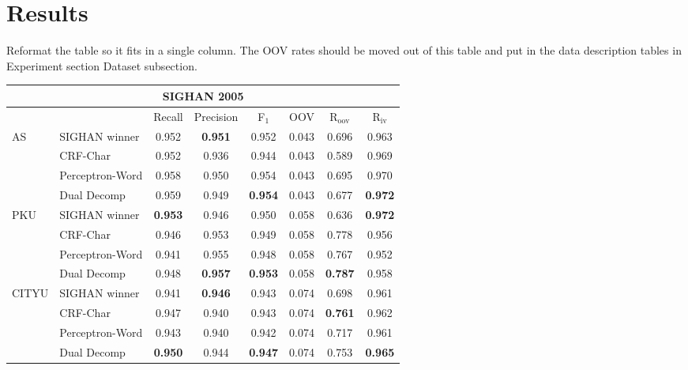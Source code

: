 \section{Results}

Reformat the table so it fits in a single column. 
The OOV rates should be moved out of this table and put in the data description tables in Experiment section Dataset subsection.

\begin{table*}
\centering
\begin{small}
\begin{tabular}{ l | l | c | c | c | c | c | c   }
\multicolumn{8}{c}{\large{SIGHAN 2005}} \\
\hline
    \multicolumn{2}{c}{}  &  \multicolumn{1}{c}{Recall} &  \multicolumn{1}{c}{Precision}  & \multicolumn{1}{c}{F$_1$}   &  \multicolumn{1}{c}{OOV} &   \multicolumn{1}{c|}{R$_{\mathrm{oov}}$}    &  \multicolumn{1}{c}{R$_{\mathrm{iv}}$}   \\ 
\hline
\multirow{4}{*}{AS} & SIGHAN winner      & 0.952 &  \textbf{0.951} & 0.952 &  0.043  &  0.696 &  0.963 \\
& CRF-Char                                                        & 0.952 &   0.936 & 0.944 & 0.043 &  0.589 & 0.969 \\
 & Perceptron-Word                                       & 0.958 & 0.950 & 0.954 & 0.043 & 0.695 & 0.970 \\ 
& Dual Decomp                                       & 0.959 & 0.949 & \textbf{0.954} & 0.043 & {0.677} & \textbf{0.972} \\
\hline

\multirow{4}{*}{PKU} &  SIGHAN winner       & \textbf{0.953}  &      0.946 &  0.950 & 0.058  &  0.636 &  \textbf{0.972} \\
& CRF-Char        & 0.946 &	0.953 & 0.949 &  0.058 &   0.778 &  0.956 \\
& Perceptron-Word  & 0.941 & 0.955	& 0.948 &  0.058 &  0.767 &  0.952 \\
& Dual Decomp  & 0.948 & \textbf{0.957} & \textbf{0.953} &  0.058 &  \textbf{0.787} &0.958 \\
\hline

\multirow{4}{*}{CITYU}  & SIGHAN winner       &  0.941 &  \textbf{0.946} & 0.943 & 0.074 & 0.698 & 0.961 \\
& CRF-Char       & 0.947 & 0.940 &  0.943 &  0.074 & \textbf{0.761} & 0.962 \\
& Perceptron-Word & 0.943 & 0.940 & 0.942 & 0.074 & 0.717  & 0.961  \\
& Dual Decomp & \textbf{0.950} & 0.944 & \textbf{0.947} & 0.074 & {0.753} & \textbf{0.965}  \\


\end{tabular}
\end{small}
\end{table*}
